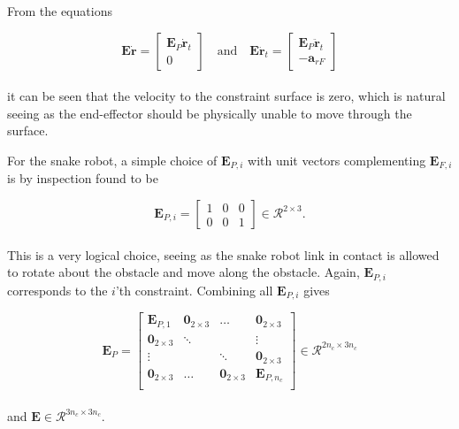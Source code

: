 From the equations

\begin{equation}
    \mathbf{E\dot{r}} =
    \begin{bmatrix}
        \mathbf{E}_P \mathbf{\dot{r}}_t\\
        0
    \end{bmatrix}
    \quad \text{and} \quad
    \mathbf{E\ddot{r}}_t =
    \begin{bmatrix}
        \mathbf{E}_P \mathbf{\ddot{r}}_t \\
        -\mathbf{a}_{r F}
    \end{bmatrix}
\end{equation}
\\
it can be seen that the velocity to the constraint surface is zero, which is natural seeing as the end-effector should be physically unable to move through the surface.

For the snake robot, a simple choice of $\mathbf{E}_{P,i}$ with unit vectors complementing $\mathbf{E}_{F,i}$ is by inspection found to be

\begin{equation}\label{eq:dhpfc_EPi}
    \mathbf{E}_{P,i} = 
    \begin{bmatrix}
        1 & 0 & 0 \\
        0 & 0 & 1
    \end{bmatrix} \in \mathcal{R}^{2\times 3}.
\end{equation}
\\
This is a very logical choice, seeing as the snake robot link in contact is allowed to rotate about the obstacle and move along the obstacle.
Again, $\mathbf{E}_{P,i}$ corresponds to the $i$'th constraint. Combining all $\mathbf{E}_{P,i}$ gives 

\begin{equation}
    \mathbf{E}_P = 
    \begin{bmatrix}
        \mathbf{E}_{P,1} & \mathbf{0}_{2\times3} & \dots & \mathbf{0}_{2\times3} \\
        \mathbf{0}_{2\times3} & \ddots & & \vdots \\
        \vdots & & \ddots & \mathbf{0}_{2\times3} \\
        \mathbf{0}_{2\times3} & \dots & \mathbf{0}_{2\times3} & \mathbf{E}_{P,n_c} \\
    \end{bmatrix} \in \mathcal{R}^{2 n_c \times 3 n_c}
\end{equation}
\\
and $\mathbf{E} \in \mathcal{R}^{3 n_c \times 3 n_c}$.

